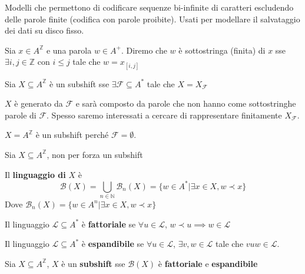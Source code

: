 Modelli che permettono di codificare sequenze bi-infinite di caratteri escludendo
delle parole finite (codifica con parole proibite). Usati per modellare il salvataggio
dei dati su disco fisso.

\begin{definizione} 
    Sia  $x\in A^\mathbb{Z}$ e una parola $w\in A^+$. Diremo che $w$ è sottostringa (finita)
    di $x$ sse $\exists i,j\in \mathbb{Z}$ con $i\le j$ tale che $w=x_{[i,j]}$
\end{definizione}

\begin{definizione} 
    Sia $X\subseteq A^\mathbb{Z}$ è un subshift sse $\exists \mathcal{F}\subseteq A^\ast$
    tale che $X= X_\mathcal{F}$
\end{definizione}

$X$ è generato da $\mathcal{F}$ e sarà composto da parole che non hanno come
sottostringhe parole di $\mathcal{F}$. Spesso saremo interessati a cercare
di rappresentare finitamente $X_\mathcal{F}$.

\begin{esempio}
    $X =  A^\mathbb{Z}$ è un subshift perché $\mathcal{F} = \emptyset$.
\end{esempio}

Sia $X\subseteq A^\mathbb{Z}$, non per forza un subshift
\begin{definizione} 
    Il \textbf{linguaggio di} $X$ è
    $$\mathcal{B}(X) = \bigcup_{n\in \mathbb{N}} \mathcal{B}_n(X)= \{w\in A^\ast| \exists x\in X, w\prec x\}$$
    Dove $\mathcal{B}_n(X) = \{w\in A^n| \exists x\in X, w\prec x\}$
\end{definizione}

\begin{definizione} 
    Il linguaggio $\mathcal{L}\subseteq A^\ast$ è \textbf{fattoriale} se $\forall
        u\in \mathcal{L}$, $w\prec u\implies w\in \mathcal{L}$

\end{definizione}


\begin{definizione} 
    Il linguaggio $\mathcal{L}\subseteq A^\ast$ è \textbf{espandibile} se $\forall
        u\in \mathcal{L}$, $\exists v,w\in \mathcal{L}$ tale che $vuw\in \mathcal{L}$.
\end{definizione}

\begin{teorema}
    Sia $X\subseteq A^\mathbb{Z}$, $X$ è un \textbf{subshift} sse $\mathcal{B}(X)$ è
    \textbf{fattoriale} e \textbf{espandibile}
\end{teorema}

